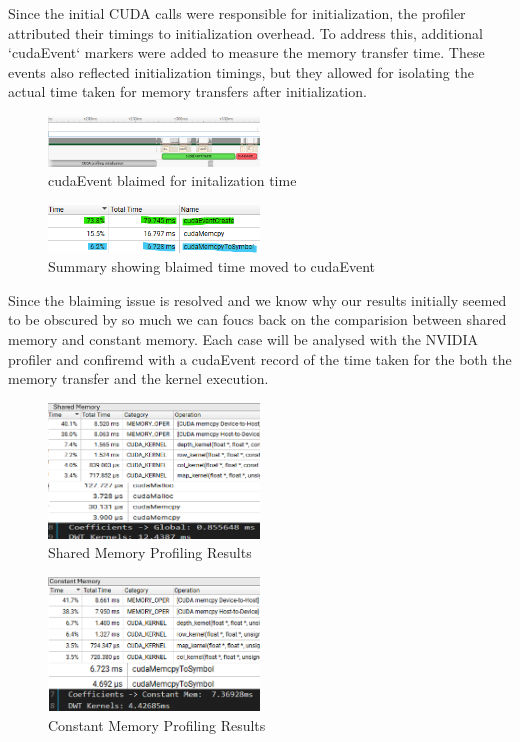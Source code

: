 \documentclass[journal,11pt]{IEEEtran}
\begin{document}
Since the initial CUDA calls were responsible for initialization, the profiler attributed their timings to initialization overhead. To address this, additional `cudaEvent` markers were added to measure the memory transfer time. These events also reflected initialization timings, but they allowed for isolating the actual time taken for memory transfers after initialization.

\begin{figure}[h]
    \centering
    \includegraphics[width=0.5\textwidth]{assets/blaimed-event.png}
    \caption{cudaEvent blaimed for initalization time}
    \label{fig:4}
\end{figure}
\vspace{-0.2em}
\begin{figure}[h]
    \centering
    \includegraphics[width=0.5\textwidth]{assets/blaimed-event-sum.png}
    \caption{Summary showing blaimed time moved to cudaEvent}
    \label{fig:5}
\end{figure}

Since the blaiming issue is resolved and we know why our results initially seemed to be obscured by so much we can foucs back on the comparision between shared memory and constant memory. Each case will be analysed with the NVIDIA profiler and confiremd with a cudaEvent record of the time taken for the both the memory transfer and the kernel execution.
\vspace{-1em}
\begin{figure}[h]
    \centering
    \includegraphics[width=0.5\textwidth]{assets/shared-prof.png}
    \caption{Shared Memory Profiling Results}
    \label{fig:6}
\end{figure}
\vspace{-2em}
\begin{figure}[h]
    \centering
    \includegraphics[width=0.5\textwidth]{assets/const-prof.png}
    \caption{Constant Memory Profiling Results}
    \label{fig:7}
\end{figure}
\end{document}
